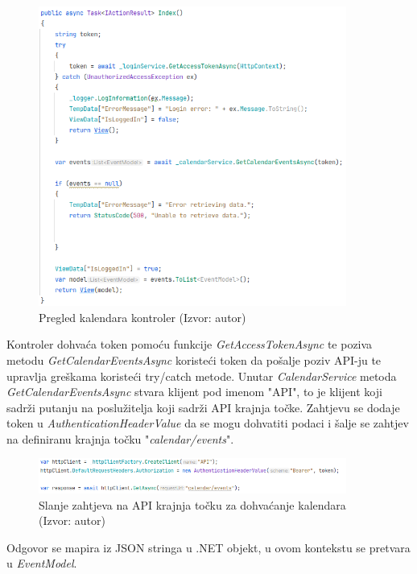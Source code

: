 \documentclass{foi}
\begin{document}
\begin{figure}[H]
    \centering
    \includegraphics[width=0.9\textwidth]{slike/cControllerIndex.png}
    \caption{Pregled kalendara kontroler (Izvor: autor)}
    \label{fig:ctrl}

\end{figure}
Kontroler dohvaća token pomoću funkcije \textit{GetAccessTokenAsync} te poziva metodu \textit{GetCalendarEventsAsync} koristeći token da pošalje poziv API-ju te upravlja greškama koristeći try/catch metode. 
Unutar \textit{CalendarService} metoda \textit{GetCalendarEventsAsync} stvara klijent pod imenom "API", to je klijent koji sadrži putanju na poslužitelja koji sadrži API krajnja točke.
Zahtjevu se dodaje token u \textit{AuthenticationHeaderValue} da se mogu dohvatiti podaci i šalje se zahtjev na definiranu krajnja točku "\textit{calendar/events}".
\begin{figure}[H]
    \centering
    \includegraphics[width=0.9\textwidth]{slike/calendarRequest.png}
    \caption{Slanje zahtjeva na API krajnja točku za dohvaćanje kalendara (Izvor: autor)}
    \label{fig:calendarRequest}

\end{figure}
Odgovor se mapira iz JSON stringa u .NET objekt, u ovom kontekstu se pretvara u \textit{EventModel}.
\end{document}
